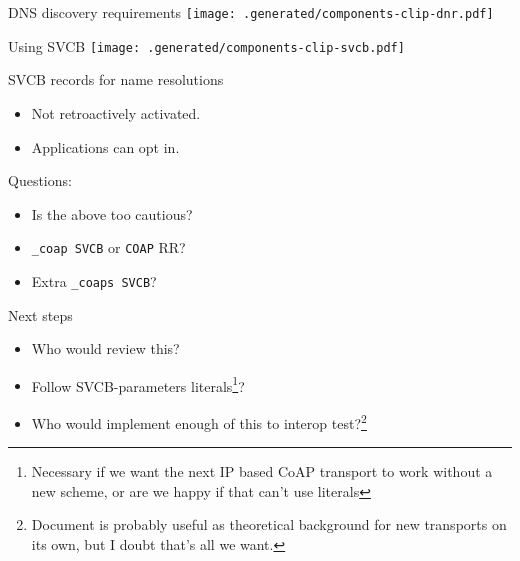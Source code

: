 \begin{frame}{DNS discovery requirements}
\vspace{-1cm}
\texttt{[image: .generated/components-clip-dnr.pdf]}
\end{frame}

\begin{frame}{Using SVCB}
\vspace{-1cm}
\texttt{[image: .generated/components-clip-svcb.pdf]}
\end{frame}

\begin{frame}{SVCB records for name resolutions}\Large
  \begin{itemize}
    \item Not retroactively activated.
    \item Applications can opt in.
  \end{itemize}

  \bigskip

  Questions:

  \begin{itemize}
    \item Is the above too cautious?
    \item \texttt{\_coap SVCB} or \texttt{COAP} RR?
    \item Extra \texttt{\_coaps SVCB}?
  \end{itemize}
\end{frame}

\begin{frame}{Next steps}\Large
  \begin{itemize}
    \item Who would review this?
    \item Follow SVCB-parameters literals\footnote{Necessary if we want the next IP based CoAP transport to work without a new scheme, or are we happy if that can't use literals}?
    \item Who would implement enough of this to interop test?\footnote{Document is probably useful as theoretical background for new transports on its own, but I doubt that's all we want.}
  \end{itemize}
\end{frame}


